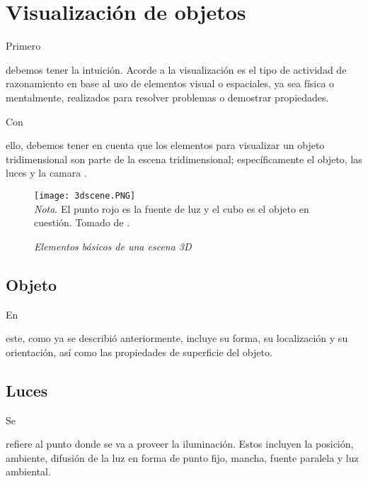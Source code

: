 \documentclass[stu, 12pt, letterpaper, donotrepeattitle, floatsintext, natbib]{apa7}
\begin{document}
    \section{Visualización de objetos}
    Primero \begin{justifying}
        debemos tener la intuición. Acorde a \cite{unknown} %
        la visualización es el tipo de actividad de razonamiento en base al uso de elementos visual o espaciales, ya sea física o mentalmente,
        realizados para resolver problemas o demostrar propiedades.
    \end{justifying}
    Con \begin{justifying}
        ello, debemos tener en cuenta que los elementos para visualizar un objeto tridimensional son parte de la escena tridimensional; específicamente el objeto, las luces y la camara \citep{guan-1999}.\par
    \end{justifying}
    \vspace{\baselineskip}
    \begin{figure}[H]
        \caption{\emph{Elementos básicos de una escena 3D}}
        \centering
        \texttt{[image: 3dscene.PNG]}
        \bigskip
    \\\small\textit{Nota}. El punto rojo es la fuente de luz y el cubo es el objeto en cuestión. Tomado de \cite{guan-1999}. 
    \end{figure}
    \vspace{\baselineskip}
    \subsection{Objeto}
    En \begin{justifying}
        este, como ya se describió anteriormente, incluye su forma, su localización y su orientación, así como las propiedades de superficie del objeto.\par
    \end{justifying}
    \vspace{\baselineskip}
    \subsection{Luces}
    Se \begin{justifying}
        refiere al punto donde se va a proveer la iluminación. Estos incluyen la posición, ambiente, difusión de la luz en forma de punto fijo, mancha,
        fuente paralela y luz ambiental.\par
    \end{justifying}
    \vspace{\baselineskip}
\end{document}
